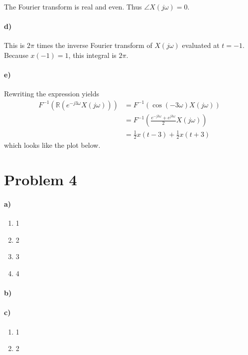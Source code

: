 \documentclass[12pt]{article}
\begin{document}
The Fourier transform is real and even. Thus \(\angle X(j\omega)=0\).

\paragraph{d)}

This is \(2\pi\) times the inverse Fourier transform of \(X(j\omega)\) evaluated at \(t=-1\). Because \(x(-1)=1\), this integral is \(2\pi\).

\paragraph{e)}

Rewriting the expression yields
\begin{align*}
    F^{-1}(\mathbb{R}(e^{-j3\omega}X(j\omega)))&=F^{-1}(\cos(-3\omega)X(j\omega))\\
    &=F^{-1}\left(\frac{e^{-j3\omega} + e^{j3\omega}}{2}X(j\omega)\right)\\
    &=\frac{1}{2}x(t-3)+\frac{1}{2}x(t+3)
\end{align*}
which looks like the plot below.
\begin{center}
\end{center}

\section*{Problem 4}

\paragraph{a)}

\begin{enumerate}
    \item 1
    \item 2
    \item 3
    \item 4
\end{enumerate}

\paragraph{b)}

\paragraph{c)}

\begin{enumerate}
    \item 1
    \item 2
\end{enumerate}
\end{document}
